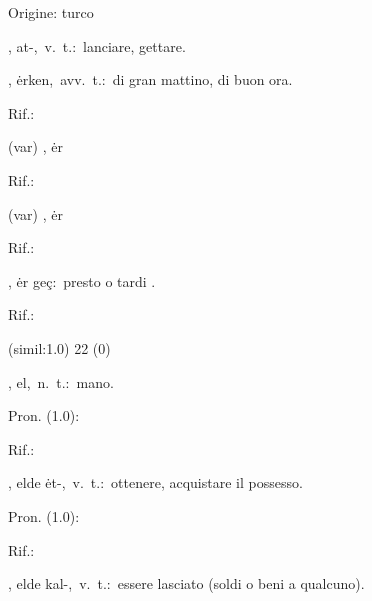 \begin{glossario}{Origine: turco}
\item[{\color{colorsologlossario}{\bf (g)}}] {\color{colorsologlossario}}, {\sf at-},\ v.\ t.:\ lanciare, gettare.
\item[{\color{colorlowref}\spzrl{^Erken}},] {\sf ėrken},\ avv.\ t.:\ di gran mattino, di buon ora.
\begin{subvocedue}
\item[Rif.:] 
\end{subvocedue}
\begin{subvocedue}
\item[(var)] , {\sf ėr}\begin{subvocedue}
\item[Rif.:] 
\end{subvocedue}
\item[(var)] , {\sf ėr}\begin{subvocedue}
\item[Rif.:] 
\end{subvocedue}
\item[\subglossariobullet] , {\sf ėr geç}:\ presto o tardi \verificare[trascrizione].
\begin{subvocedue}
\item[Rif.:] 
\end{subvocedue}
\item[(simil:1.0)]   22 (0)
\end{subvocedue}
\item[{\color{colorlowref}\spzrl{^El}},] {\sf el},\ n.\ t.:\ mano.
\begin{subvocedue}
\item[Pron. (1.0):] 
\item[Rif.:] 
\end{subvocedue}
\begin{subvocedue}
\item[\subglossariobullet] , {\sf elde ėt-},\ v.\ t.:\ ottenere, acquistare il possesso.
\begin{subvocedue}
\item[Pron. (1.0):] 
\item[Rif.:] 
\end{subvocedue}
\item[\subglossariobullet] , {\sf elde kal-},\ v.\ t.:\ essere lasciato (soldi o beni a qualcuno).

\end{subvocedue}
\end{glossario}

